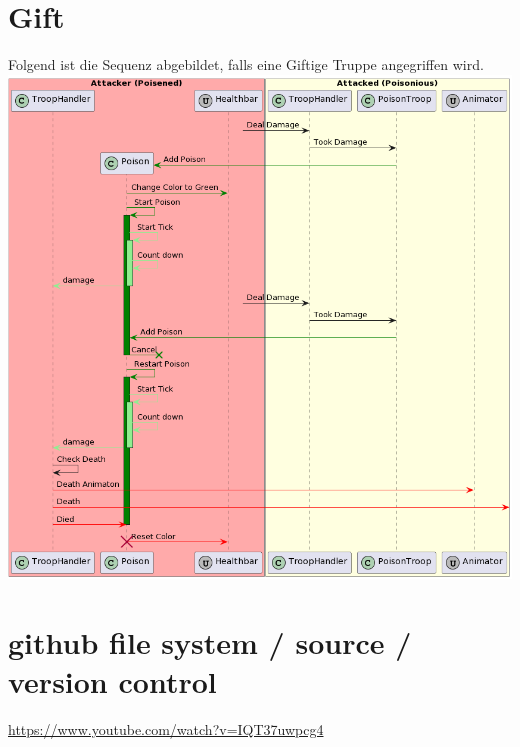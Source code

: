 \section{Gift}
Folgend ist die Sequenz abgebildet, falls eine Giftige Truppe angegriffen wird. \\
\includegraphics[width=15cm]{resources/Poison.png} \\


\section*{github file system / source / version control}
\url{https://www.youtube.com/watch?v=IQT37uwpcg4}